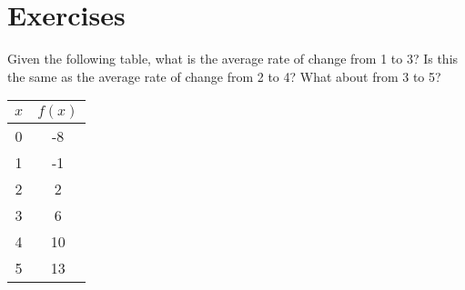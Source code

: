 

\section*{Exercises}

\begin{exercise}
	Given the following table, what is the average rate of change from 1 to 3?  Is this the same as the average rate of change from 2 to 4?  What about from 3 to 5?
	
	\begin{tabular}{|c|c|}
	\hline
	$x$ & $f(x)$ \\
	\hline
	0	&	-8\\
	\hline
	1	&	-1\\
	\hline
	2	&	2\\
	\hline
	3	&	6\\
	\hline
	4	&	10\\
	\hline
	5	&	13\\
	\hline
	\end{tabular}
\end{exercise}
\bigskip

